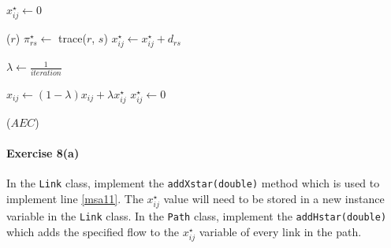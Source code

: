 \documentclass[12pt]{article}
\newcommand{\A}{\mathcal{A}}
\newcommand{\Z}{\mathcal{Z}}
\begin{document}
\vspace{\baselineskip}

\begin{algorithmic}[1]
	\For{$(i,j)\in\A$} 
	\State $x^\star_{ij} \leftarrow 0$
	\EndFor
	
	\vspace{0.5\baselineskip}
	
	 \label{msa5}
	\For{$r\in\Z$}  \label{msa6}
	($r$) 
	\For{$s\in\Z$}
	\State $\pi^\star_{rs} \leftarrow$ {\sc trace($r$, $s$)}
	 
	\State $x^\star_{ij} \leftarrow x^\star_{ij} + d_{rs}$ \label{msa11}
	\EndFor
	\EndFor
	\EndFor \label{msa14}
	
	\vspace{0.5\baselineskip}
	
	
	\State $\lambda \leftarrow \frac{1}{iteration}$  \label{msa15}
	
	\vspace{0.5\baselineskip}
	
	\For{$(i,j)\in\A$}  \label{msa16}
	\State $x_{ij} \leftarrow (1-\lambda)x_{ij} + \lambda x^\star_{ij}$ \label{msa17}
	\State $x^\star_{ij}\leftarrow 0$ \label{msa18}
	\EndFor
	
	\vspace{0.5\baselineskip}
	
	($AEC$) 
	
	\EndFor
	\EndProcedure
\end{algorithmic}


\paragraph*{Exercise 8(a)} In the \texttt{Link} class, implement the \texttt{addXstar(double)} method which is used to implement line \ref{msa11}. 
The $x^\star_{ij}$ value will need to be stored in a new instance variable in the \texttt{Link} class.
In the \texttt{Path} class, implement the \texttt{addHstar(double)} which adds the specified flow to the $x^\star_{ij}$ variable of every link in the path.
\end{document}
